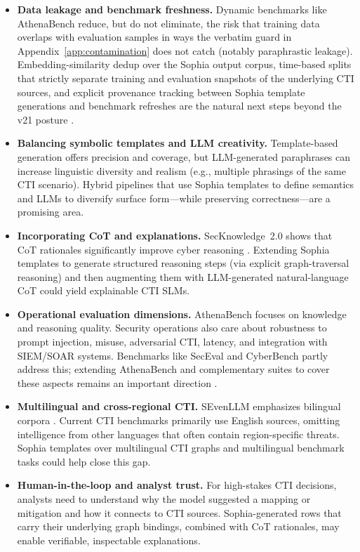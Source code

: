 \documentclass[webpdf,contemporary,large]{oup-authoring-template}
\theoremstyle{thmstyleone}
\theoremstyle{thmstyletwo}
\theoremstyle{thmstylethree}
\begin{document}
\begin{itemize}
  \item \textbf{Data leakage and benchmark freshness.} Dynamic benchmarks like AthenaBench reduce, but do not eliminate, the risk that training data overlaps with evaluation samples in ways the verbatim guard in Appendix~\ref{app:contamination} does not catch (notably paraphrastic leakage). Embedding-similarity dedup over the Sophia output corpus, time-based splits that strictly separate training and evaluation snapshots of the underlying CTI sources, and explicit provenance tracking between Sophia template generations and benchmark refreshes are the natural next steps beyond the v21 posture \cite{alam2025athenabench,cardei2025ift}.
  \item \textbf{Balancing symbolic templates and LLM creativity.} Template-based generation offers precision and coverage, but LLM-generated paraphrases can increase linguistic diversity and realism (e.g., multiple phrasings of the same CTI scenario). Hybrid pipelines that use Sophia templates to define semantics and LLMs to diversify surface form---while preserving correctness---are a promising area.
  \item \textbf{Incorporating CoT and explanations.} SecKnowledge~2.0 shows that CoT rationales significantly improve cyber reasoning \cite{levi2025toward}. Extending Sophia templates to generate structured reasoning steps (via explicit graph-traversal reasoning) and then augmenting them with LLM-generated natural-language CoT could yield explainable CTI SLMs.
  \item \textbf{Operational evaluation dimensions.} AthenaBench focuses on knowledge and reasoning quality. Security operations also care about robustness to prompt injection, misuse, adversarial CTI, latency, and integration with SIEM/SOAR systems. Benchmarks like SecEval and CyberBench partly address this; extending AthenaBench and complementary suites to cover these aspects remains an important direction \cite{hu2024seceval,liu2024cyberbench,alam2025athenabench}.
  \item \textbf{Multilingual and cross-regional CTI.} SEvenLLM emphasizes bilingual corpora \cite{ji2024sevenllm}. Current CTI benchmarks primarily use English sources, omitting intelligence from other languages that often contain region-specific threats. Sophia templates over multilingual CTI graphs and multilingual benchmark tasks could help close this gap.
  \item \textbf{Human-in-the-loop and analyst trust.} For high-stakes CTI decisions, analysts need to understand why the model suggested a mapping or mitigation and how it connects to CTI sources. Sophia-generated rows that carry their underlying graph bindings, combined with CoT rationales, may enable verifiable, inspectable explanations.
\end{itemize}
\end{document}
